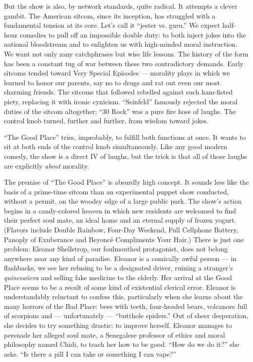 But the show is also, by network standards, quite radical. It attempts a
clever gambit. The American sitcom, since its inception, has struggled
with a fundamental tension at its core. Let's call it ``jester vs.
guru.'' We expect half-hour comedies to pull off an impossible double
duty: to both inject jokes into the national bloodstream and to
enlighten us with high-minded moral instruction. We want not only zany
catchphrases but wise life lessons. The history of the form has been a
constant tug of war between these two contradictory demands. Early
sitcoms tended toward Very Special Episodes --- morality plays in which
we learned to honor our parents, say no to drugs and rat out even our
most charming friends. The sitcoms that followed rebelled against such
ham-fisted piety, replacing it with ironic cynicism. ``Seinfeld''
famously rejected the moral duties of the sitcom altogether; ``30 Rock''
was a pure fire hose of laughs. The control knob turned, further and
further, from wisdom toward jokes.

``The Good Place'' tries, improbably, to fulfill both functions at once.
It wants to sit at both ends of the control knob simultaneously. Like
any good modern comedy, the show is a direct IV of laughs, but the trick
is that all of those laughs are explicitly \emph{about} morality.

The premise of ``The Good Place'' is absurdly high concept. It sounds
less like the basis of a prime-time sitcom than an experimental puppet
show conducted, without a permit, on the woodsy edge of a large public
park. The show's action begins in a candy-colored heaven in which new
residents are welcomed to find their perfect soul mate, an ideal home
and an eternal supply of frozen yogurt. (Flavors include Double Rainbow,
Four-Day Weekend, Full Cellphone Battery, Panoply of Exuberance and
Beyoncé Compliments Your Hair.) There is just one problem: Eleanor
Shellstrop, our foulmouthed protagonist, does not belong anywhere near
any kind of paradise. Eleanor is a comically awful person --- in
flashbacks, we see her refusing to be a designated driver, ruining a
stranger's \emph{quinceañera} and selling fake medicine to the elderly.
Her arrival at the Good Place seems to be a result of some kind of
existential clerical error. Eleanor is understandably reluctant to
confess this, particularly when she learns about the many horrors of the
Bad Place: bees with teeth, four-headed bears, volcanoes full of
scorpions and --- unfortunately --- ``butthole spiders.'' Out of sheer
desperation, she decides to try something drastic: to improve herself.
Eleanor manages to persuade her alleged soul mate, a Senegalese
professor of ethics and moral philosophy named Chidi, to teach her how
to be good. ``How do we do it?'' she asks. ``Is there a pill I can take
or something I can vape?''

